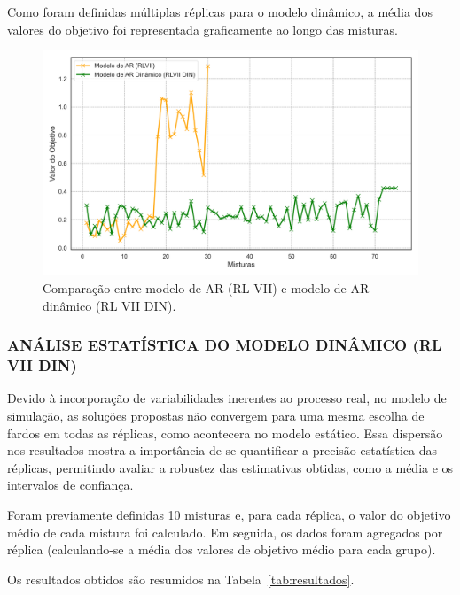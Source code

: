 \documentclass[
    12pt,                %
    openright,           %
    oneside,             %
    a4paper,             %
    english,             %
    spanish,             %
    brazil               %
]{ufscar}
\begin{document}
Como foram definidas múltiplas réplicas para o modelo dinâmico, a média dos valores do objetivo foi representada graficamente ao longo das misturas.

\begin{figure}[hbt]
\centering
  \caption{Comparação entre modelo de AR (RL VII) e modelo de AR dinâmico (RL VII DIN).}
  \label{figure:DINRLVII}
  \includegraphics[width=1\textwidth]{figures/DINRLVII.png}
\end{figure}

\subsubsection{ANÁLISE ESTATÍSTICA DO MODELO DINÂMICO (RL VII DIN)}

Devido à incorporação de variabilidades inerentes ao processo real, no modelo de simulação, as soluções propostas não convergem para uma mesma escolha de fardos em todas as réplicas, como acontecera no modelo estático. Essa dispersão nos resultados mostra a importância de se quantificar a precisão estatística das réplicas, permitindo avaliar a robustez das estimativas obtidas, como a média e os intervalos de confiança.

Foram previamente definidas 10 misturas e, para cada réplica, o valor do objetivo médio de cada mistura foi calculado. Em seguida, os dados foram agregados por réplica (calculando-se a média dos valores de objetivo médio para cada grupo).

Os resultados obtidos são resumidos na Tabela~\ref{tab:resultados}.
\end{document}
